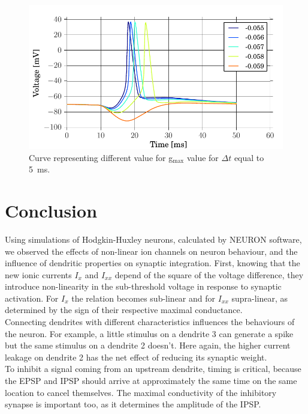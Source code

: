 \documentclass[a4paper, 10pt, conference]{ieeeconf}      %
\begin{document}
\begin{figure}
\begin{center}
\includegraphics[width=\columnwidth]{../figures/2_3-veto_spike.pdf}
\end{center}
\label{fig:2_1_4}
\caption{Curve representing different value for g$_\text{max}$ value for $\Delta t$ equal to \SI{5}{\milli\second}.}
\end{figure}






\section{Conclusion}
Using simulations of Hodgkin-Huxley neurons, calculated by NEURON software, we observed the effects of non-linear ion channels on neuron behaviour, and the influence of dendritic properties on synaptic integration. First, knowing that the new ionic currents $I_x$ and $I_{xx}$ depend of the square of the voltage difference, they introduce non-linearity in the sub-threshold voltage in response to synaptic activation. For $I_x$ the relation becomes sub-linear and for $I_{xx}$ supra-linear, as determined by the sign of their respective maximal conductance.\\

Connecting dendrites with different characteristics influences the behaviours of the neuron. For example, a little stimulus on a dendrite 3 can generate a spike but the same stimulus on a dendrite 2 doesn't. Here again, the higher current leakage on dendrite 2 has the net effect of reducing its synaptic weight.\\

To inhibit a signal coming from an upstream dendrite, timing is critical, because the EPSP and IPSP should arrive at approximately the same time on the same location to cancel themselves. The maximal conductivity of the inhibitory synapse is important too, as it determines the amplitude of the IPSP.\\

\nocite{*}




\end{document}
